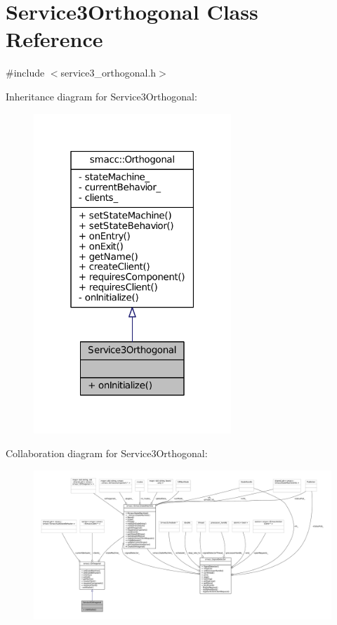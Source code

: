 \hypertarget{classService3Orthogonal}{}\section{Service3\+Orthogonal Class Reference}
\label{classService3Orthogonal}


{\ttfamily \#include $<$service3\+\_\+orthogonal.\+h$>$}



Inheritance diagram for Service3\+Orthogonal\+:
\nopagebreak
\begin{figure}[H]
\begin{center}
\leavevmode
\includegraphics[width=211pt]{classService3Orthogonal__inherit__graph}
\end{center}
\end{figure}


Collaboration diagram for Service3\+Orthogonal\+:
\nopagebreak
\begin{figure}[H]
\begin{center}
\leavevmode
\includegraphics[width=350pt]{classService3Orthogonal__coll__graph}
\end{center}
\end{figure}

